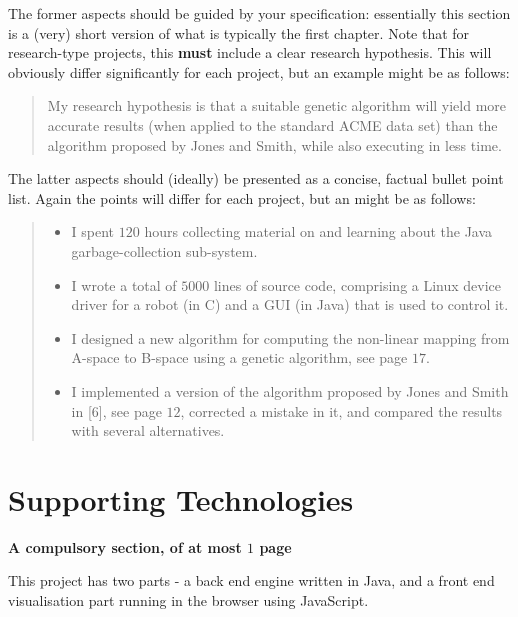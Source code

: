 \documentclass[ draft,
                    author={Alexander Hill},
                supervisor={Dr. Benjamin Sach},
                    degree={MEng},
                     title={MARMOSET: Multi Agent Real-time Multi-core Online
                     Simulation for Efficient Transportation},
                  subtitle={},
                      type={research},
                      year={2016} ]{dissertation}
\begin{document}
The former aspects should be guided by your specification: essentially
this section is a (very) short version of what is typically the first
chapter.  Note that for research-type projects, this {\bf must} include
a clear research hypothesis.  This will obviously differ significantly
for each project, but an example might be as follows:

\begin{quote}
My research hypothesis is that a suitable genetic algorithm will yield
more accurate results (when applied to the standard ACME data set) than
the algorithm proposed by Jones and Smith, while also executing in less
time.
\end{quote}

\noindent
The latter aspects should (ideally) be presented as a concise, factual
bullet point list.  Again the points will differ for each project, but
an might be as follows:

\begin{quote}
\noindent
\begin{itemize}
\item I spent $120$ hours collecting material on and learning about the
      Java garbage-collection sub-system.
\item I wrote a total of $5000$ lines of source code, comprising a Linux
      device driver for a robot (in C) and a GUI (in Java) that is
      used to control it.
\item I designed a new algorithm for computing the non-linear mapping
      from A-space to B-space using a genetic algorithm, see page $17$.
\item I implemented a version of the algorithm proposed by Jones and
      Smith in [6], see page $12$, corrected a mistake in it, and
      compared the results with several alternatives.
\end{itemize}
\end{quote}


\chapter*{Supporting Technologies}

{\bf A compulsory section, of at most $1$ page}
\vspace{1cm}

\noindent
This project has two parts - a back end engine written in Java, and a front end
visualisation part running in the browser using JavaScript.
\end{document}
